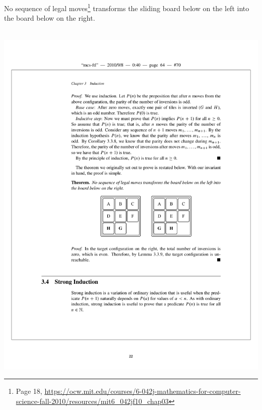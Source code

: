 \documentclass[12pt]{article}
\begin{document}
\begin{theorem}
    No sequence of legal moves\footnote{Page 18, \url{https://ocw.mit.edu/courses/6-042j-mathematics-for-computer-science-fall-2010/resources/mit6_042jf10_chap03}} transforms the sliding board below on the left into the board below on the right.\\~

    \includegraphics{w01-8puzzle.pdf}
\end{theorem}
\end{document}
